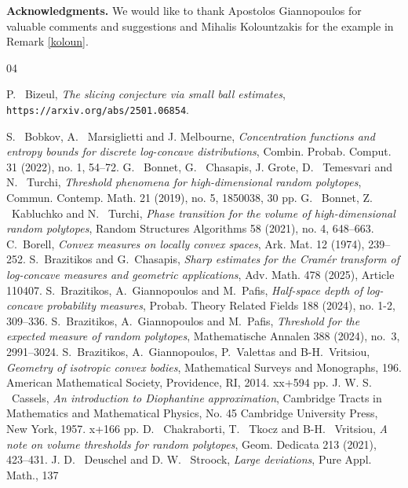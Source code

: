 \documentclass[11pt,a4paper]{article} %
\theoremstyle{definition}
\theoremstyle{remark}
\newcommand{\1}{\mathds{1}}
\begin{document}
\bigskip
\textbf{Acknowledgments.} We would like to thank Apostolos Giannopoulos for valuable comments and suggestions and Mihalis Kolountzakis for the example in Remark \ref{koloun}.
\medskip

\footnotesize

\begin{thebibliography}{04}

 \textrm{P. \ Bizeul}, \textit{The slicing conjecture via small ball estimates}, \texttt{https://arxiv.org/abs/2501.06854}.

 \textrm{S. \ Bobkov, A. \ Marsiglietti and J. Melbourne}, \textit{Concentration functions and entropy bounds for discrete log-concave distributions}, Combin. Probab. Comput. 31 (2022), no. 1, 54–72.
 \textrm{G. \ Bonnet, G. \ Chasapis, J. Grote, D. \ Temesvari and N. \ Turchi}, \textit{Threshold phenomena for high-dimensional random polytopes}, Commun. Contemp. Math. 21 (2019), no. 5, 1850038, 30 pp.
 \textrm{G. \ Bonnet, Z. \ Kabluchko and N. \ Turchi}, \textit{Phase transition for the volume of high-dimensional random polytopes}, Random Structures Algorithms 58 (2021), no. 4, 648–663.
 \textrm{C.\ Borell}, \textit{Convex measures on locally convex spaces}, Ark. Mat. {12} (1974), 239--252.
 \textrm{S.\ Brazitikos and G.\ Chasapis}, \textit{Sharp estimates for the Cram\'{e}r transform of  log-concave  measures and  geometric  applications},  Adv. Math. 478 (2025), Article 110407.
 \textrm{S.~Brazitikos, A.~Giannopoulos and M.~Pafis}, \textit{Half-space depth of log-concave probability measures}, Probab. Theory Related Fields 188 (2024), no. 1-2, 309–336.
 \textrm{S.~Brazitikos, A.~Giannopoulos and M.~Pafis}, \textit{Threshold for the expected measure of random polytopes}, Mathematische  Annalen 388 (2024), no.~3, 2991--3024.
 \textrm{S.\ Brazitikos, A.\ Giannopoulos, P.\ Valettas and B-H.\ Vritsiou}, \textit{Geometry of isotropic
convex bodies}, Mathematical Surveys and Monographs, 196. American Mathematical Society, Providence, RI, 2014. xx+594 pp.
 \textrm{J. W. S. \ Cassels}, \textit{An introduction to Diophantine approximation}, Cambridge Tracts in Mathematics and Mathematical Physics, No. 45
Cambridge University Press, New York, 1957. x+166 pp.
 \textrm{D. \ Chakraborti, T. \ Tkocz and B-H. \ Vritsiou}, \textit{A note on volume thresholds for random polytopes}, Geom. Dedicata 213 (2021), 423–431.
 \textrm{J. D. \ Deuschel and D. W. \ Stroock}, \textit{Large deviations}, Pure Appl. Math., 137

\end{thebibliography}
\end{document}
